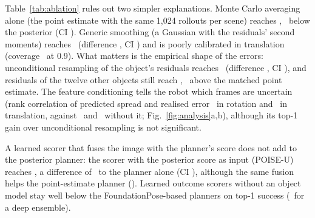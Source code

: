 \documentclass[pdflatex,sn-nature,iicol]{sn-jnl}
\begin{document}
Table~\ref{tab:ablation} rules out two simpler explanations. Monte Carlo averaging alone (the point estimate with the same 1,024 rollouts per scene) reaches \PointSixFourTop, \CmpPostPointSixFourAbs\ below the posterior (CI \CmpPostPointSixFourCi). Generic smoothing (a Gaussian with the residuals' second moments) reaches \GaussTop\ (difference \CmpPostGauss, CI \CmpPostGaussCi) and is poorly calibrated in translation (coverage \CalGaussTransNine\ at 0.9). What matters is the empirical shape of the errors: unconditional resampling of the object's residuals reaches \ObjTop\ (difference \CmpPostObj, CI \CmpPostObjCi), and residuals of the twelve other objects still reach \XoTop, \CmpXoPointSixFourAbs\ above the matched point estimate. The feature conditioning tells the robot which frames are uncertain (rank correlation of predicted spread and realised error \RhoKnnRot\ in rotation and \RhoKnnTrans\ in translation, against \RhoObjRot\ and \RhoObjTrans\ without it; Fig.~\ref{fig:analysis}a,b), although its top-1 gain over unconditional resampling is not significant.

A learned scorer that fuses the image with the planner's score does not add to the posterior planner: the scorer with the posterior score as input (POISE-U) reaches \PoiseUTop, a difference of \CmpPoiseUPost\ to the planner alone (CI \CmpPoiseUPostCi), although the same fusion helps the point-estimate planner (\PoiseTop). Learned outcome scorers without an object model stay well below the FoundationPose-based planners on top-1 success (\EnsTop\ for a deep ensemble).

\begin{table}[t]
\caption{\textbf{Matched comparison on the LM-Grasp test split} (\NTest\ scenes). n: training seeds (learned methods) or runs; mean $\pm$ s.d. over seeds. Top-1: success of the highest-scoring candidate. AUC: within-scene ranking AUC. Sel@25\%: success on the 25\% of scenes with the most confident choice. Cert.: certified fraction / precision of selection-conditional split conformal prediction at $\alpha=0.1$ (planners without a calibration-split run: --). Shading marks the best and second-best value among non-privileged methods; our rows are tinted. Pose-then-plan methods use the object's mesh, the simulator and the physics prior at decision time.}\label{tab:main}
\centering\footnotesize
\setlength{\tabcolsep}{3.2pt}

\end{table}

\begin{table}[t]
\caption{\textbf{What the posterior needs} (LM-Grasp test split). Every row plans the same 16 candidates with common physics draws; rollouts are per scene. Cov@0.9: fraction of scenes whose FoundationPose rotation / translation error lies below the distribution's 90\% quantile (calibrated: 0.90). $\rho$: Spearman correlation between the predicted spread of a frame and its realised error. $\Delta$: paired difference in top-1 success to the point estimate with the same 1,024 rollouts.}\label{tab:ablation}
\centering\footnotesize
\setlength{\tabcolsep}{2.6pt}

\end{table}
\end{document}
